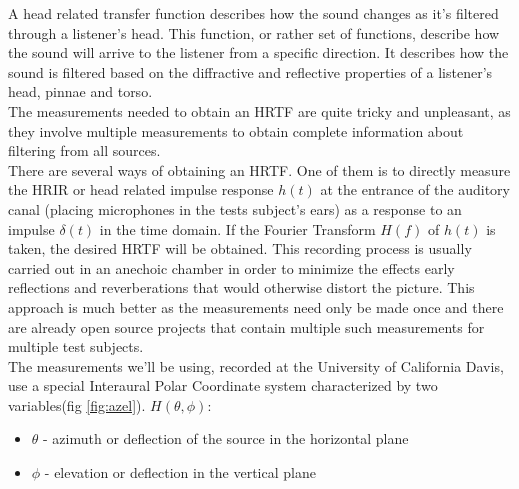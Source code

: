 \documentclass[a4paper,12pt,oneside]{article}
\begin{document}
A head related transfer function describes how the sound changes as it's filtered through a listener's head. This function, or rather set of functions, describe how the sound will arrive to the listener from a specific direction. It describes how the sound is filtered based on the diffractive and reflective properties of a listener's head, pinnae and torso.\\
The measurements needed to obtain an HRTF are quite tricky and unpleasant, as they involve multiple measurements to obtain complete information about filtering from all sources.\\
There are several ways of obtaining an HRTF. One of them is to directly measure the HRIR or head related impulse response $h(t)$ at the entrance of the auditory canal (placing microphones in the tests subject's ears) as a response to an impulse $\delta(t)$ in the time domain. If the Fourier Transform $H(f)$ of $h(t)$ is taken, the desired HRTF will be obtained. This recording process is usually carried out in an anechoic chamber in order to minimize the effects early reflections and reverberations that would otherwise distort the picture. This approach is much better as the measurements need only be made once and there are already open source projects that contain multiple such measurements for multiple test subjects.\cite{cipic1}\\


The measurements we'll be using, recorded at the University of California Davis, use a special Interaural Polar Coordinate system characterized by two variables(fig \ref{fig:azel}). \cite{cipic2} $H(\theta,\phi)$:
\begin{itemize}
\item $\theta$ - azimuth or deflection of the source in the horizontal plane
\item $\phi$ - elevation or deflection in the vertical plane
\end{itemize}
\end{document}
